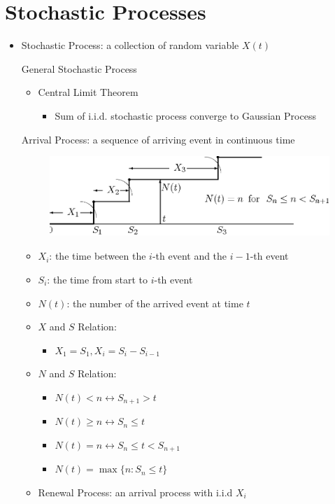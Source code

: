 \documentclass[a4paper]{article}
\begin{document}
\section{Stochastic Processes}
\begin{itemize}
    \item Stochastic Process: a collection of random variable $X(t)$

        General Stochastic Process
        \begin{itemize}
            \item Central Limit Theorem
                \begin{itemize}
                    \item Sum of i.i.d. stochastic process converge to Gaussian Process
                \end{itemize}
        \end{itemize}
        Arrival Process: a sequence of arriving event in continuous time
\begin{figure} [H]
    \includegraphics[width=0.5\linewidth, center]{image/arrival_process.png}
\end{figure}
        \begin{itemize}
            \item $X_i$: the time between the $i$-th event and the $i-1$-th event
            \item $S_i$: the time from start to $i$-th event
            \item $N(t)$: the number of the arrived event at time $t$
            \item $X$ and $S$ Relation:
                \begin{itemize}
                    \item $X_1 = S_1, X_i = S_i - S_{i-1}$
                \end{itemize}
            \item $N$ and $S$ Relation:
                \begin{itemize}
                    \item $N(t) < n \leftrightarrow S_{n+1} > t$
                    \item $N(t) \geq n \leftrightarrow S_n \leq t$
                    \item $N(t) = n \leftrightarrow S_n \leq t < S_{n+1}$
                    \item $N(t) = \max \{n: S_n \leq t\}$
                \end{itemize}
            \item Renewal Process: an arrival process with i.i.d $X_i$


\end{itemize}
\end{itemize}
\end{document}

